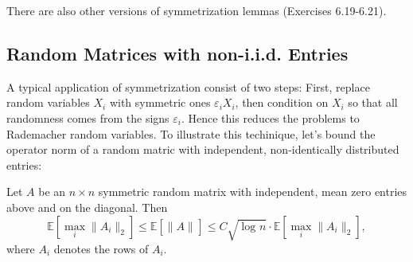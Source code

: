 There are also other versions of symmetrization lemmas (Exercises 6.19-6.21).



\subsection{Random Matrices with non-i.i.d. Entries}
A typical application of symmetrization consist of two steps: First, replace random variables $X_i$ with 
symmetric ones $\varepsilon_i X_i$, then condition on $X_i$ so that all randomness comes from the signs 
$\varepsilon_i$. Hence this reduces the problems to Rademacher random variables. To illustrate this techinique, 
let's bound the operator norm of a random matric with independent, non-identically distributed entries:

\begin{theorem}
\label{thm:6.4.1}
Let $A$ be an $n \times n$ symmetric random matrix with independent, mean zero entries above and on the 
diagonal. Then 
\[ \mathbb{E}\left[ \max_{i} \lVert A_i \rVert_{2} \right] \leq \mathbb{E}\left[ \lVert A \rVert_{} \right] 
\leq C \sqrt{\log_{}{n}} \cdot \mathbb{E}\left[ \max_{i} \lVert A_i \rVert_{2} \right], \]
where $A_i$ denotes the rows of $A_i$.
\end{theorem}

